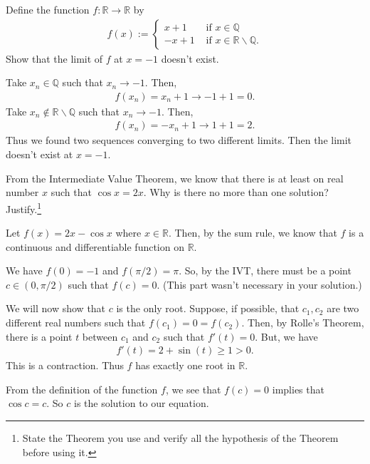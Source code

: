 \documentclass[addpoints, 12pt]{exam}%
\newcommand{\bR}{\mathbb{R}}
\newcommand{\bQ}{\mathbb{Q}}
\newcommand{\ra}{\rightarrow}
\theoremstyle{definition}
\begin{document}
\begin{questions}

\question[10]
Define the function $f : \bR \ra \bR$ by
	\begin{align*}
	f(x) := \begin{cases}
	x + 1 & \text{ if } x\in \bQ \\
	-x + 1 & \text{ if } x \in \bR \backslash \bQ .
	\end{cases}
	\end{align*}
	Show that the limit of $f$ at $x = -1$ doesn't exist.
	\begin{solution}
	Take $x_n \in \bQ$ such that $x_n \ra -1$. Then, 
		\begin{align*}
		f(x_n) = x_n + 1 \ra -1 + 1 = 0 .
		\end{align*}
	Take $x_n \not\in \bR \backslash \bQ$ such that $x_n \ra -1$. Then,
		\begin{align*}
		f(x_n) = -x_n + 1 \ra 1 + 1 = 2 .
		\end{align*}
	Thus we found two sequences converging to two different limits. Then the limit doesn't exist at $x = -1$.
	\end{solution}

\newpage

\question[15]
From the Intermediate Value Theorem, we know that there is at least on real number $x$ such that $\cos x = 2x$. Why is there no more than one solution? Justify.\footnote{State the Theorem you use and verify all the hypothesis of the Theorem before using it.}
\begin{solution}
Let $f(x) = 2x - \cos x$ where $x \in \bR$. Then, by the sum rule, we know that $f$ is a continuous and differentiable function on $\bR$. 

We have $f(0) = -1$ and $f(\pi/2) = \pi $. So, by the IVT, there must be a point $c \in (0, \pi /2 )$ such that $f (c) = 0$. (This part wasn't necessary in your solution.)

We will now show that $c$ is the only root. Suppose, if possible, that $c_1 , c_2$ are two different real numbers such that $f(c_1) = 0 = f(c_2)$. Then, by Rolle's Theorem, there is a point $t $ between $c_1$ and $c_2$ such that $f'(t) = 0$. But, we have
	\begin{align*}
	f'(t) = 2 + \sin (t) \geq 1 > 0 .
	\end{align*}
This is a contraction. Thus $f$ has exactly one root in $\bR$. 

From the definition of the function $f$, we see that $f(c) = 0$ implies that $\cos c = c$. So $c$ is the solution to our equation.
\end{solution}
	

\end{questions}
\end{document}
